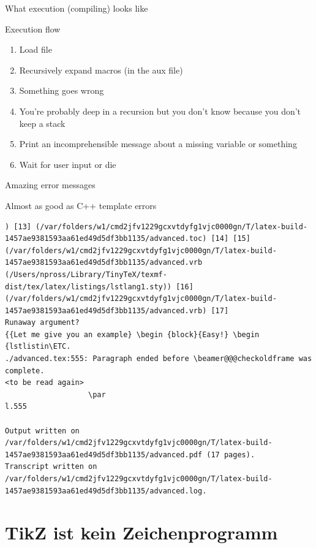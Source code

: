 \documentclass[xetex, onlymath, handout]{beamer}
\begin{document}
\begin{frame}{What execution (compiling) looks like}
  \begin{block}{Execution flow}
    \begin{enumerate}
      \item Load file
      \item Recursively expand macros (in the aux file)
      \item Something goes wrong
      \item You're probably deep in a recursion but you don't know because you don't keep a stack
      \item Print an incomprehensible message about a missing variable or something
      \item Wait for user input or die
    \end{enumerate}
  \end{block}
\end{frame}

\begin{frame}[fragile]{Amazing error messages}
  \begin{block}{Almost as good as C++ template errors}
    \footnotesize
    \begin{verbatim}
) [13] (/var/folders/w1/cmd2jfv1229gcxvtdyfg1vjc0000gn/T/latex-build-1457ae9381593aa61ed49d5df3bb1135/advanced.toc) [14] [15] (/var/folders/w1/cmd2jfv1229gcxvtdyfg1vjc0000gn/T/latex-build-1457ae9381593aa61ed49d5df3bb1135/advanced.vrb (/Users/npross/Library/TinyTeX/texmf-dist/tex/latex/listings/lstlang1.sty)) [16] (/var/folders/w1/cmd2jfv1229gcxvtdyfg1vjc0000gn/T/latex-build-1457ae9381593aa61ed49d5df3bb1135/advanced.vrb) [17]
Runaway argument?
{{Let me give you an example} \begin {block}{Easy!} \begin {lstlistin\ETC.
./advanced.tex:555: Paragraph ended before \beamer@@@checkoldframe was complete.
<to be read again> 
                   \par 
l.555 
      
Output written on /var/folders/w1/cmd2jfv1229gcxvtdyfg1vjc0000gn/T/latex-build-1457ae9381593aa61ed49d5df3bb1135/advanced.pdf (17 pages).
Transcript written on /var/folders/w1/cmd2jfv1229gcxvtdyfg1vjc0000gn/T/latex-build-1457ae9381593aa61ed49d5df3bb1135/advanced.log.
    \end{verbatim}
  \end{block}
\end{frame}

\section{TikZ ist kein Zeichenprogramm}
\end{document}

